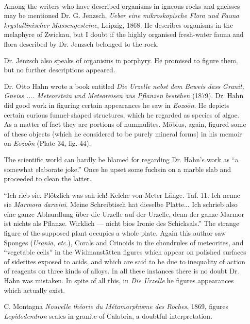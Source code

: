 \documentclass[a4paper, 12pt, oneside, landscape]{article}
\begin{document}
\paragraph{}
Among the writers who have described organisms in igneous rocks and gneisses may be mentioned Dr. G. Jenzsch, \emph{Ueber eine mikroskopische Flora und Fauna krystallinischer Massengesteine}, Leipzig, 1868. He describes organisms in the melaphyre of Zwickau, but I doubt if the highly organised fresh-water fauna and flora described by Dr. Jenzsch belonged to the rock.

Dr. Jenzsch also speaks of organisms in porphyry. He promised to figure them, but no further descriptions appeared.

Dr. Otto Hahn wrote a book entitled \emph{Die Urzelle nebst dem Beweis dass Granit, Gneiss .... Meteorstein und Meteoreisen aus Pflanzen bestehen} (1879). Dr. Hahn did good work in figuring certain appearances he saw in \emph{Eozoön}. He depicts certain curious funnel-shaped structures, which he regarded as species of algae. As a matter of fact they are portions of nummulites. Möbius, again, figured some of these objects (which he considered to be purely mineral forms) in his memoir on \emph{Eozoön} (Plate 34, fig. 44).

The scientific world can hardly be blamed for regarding Dr. Hahn's work as ``a somewhat elaborate joke.'' Once he upset some fuchsin on a marble slab and proceeded to clean the latter.

``Ich rieb sie. Plötzlich was sah ich! Kelche von Meter Länge. Taf. 11. Ich nenne sie \emph{Marmora darwini}. Meine Schreibtisch hat dieselbe Platte... Ich schrieb also eine ganze Abhandlung über die Urzelle auf der Urzelle, denn der ganze Marmor ist nichts als Pflanze. Wirklich --- nicht bios Ironie des Schicksals.'' The strange figure of the supposed plant occupies a whole plate. Again this author saw Sponges (\emph{Urania}, \emph{etc.}), Corals and Crinoids in the chondrules of meteorites, and ``vegetable cells'' in the Widmanstätten figures which appear on polished surfaces of siderites exposed to acids, and which are said to be due to inequality of action of reagents on three kinds of alloys. In all these instances there is no doubt Dr. Hahn was mistaken. In spite of all this, in \emph{Die Urzelle} he figures appearances which actually exist.

C. Montagna \emph{Nouvelle théorie du Métamorphisme des Roches}, 1869, figures \emph{Lepidodendron} scales in granite of Calabria, a doubtful interpretation.
\end{document}
